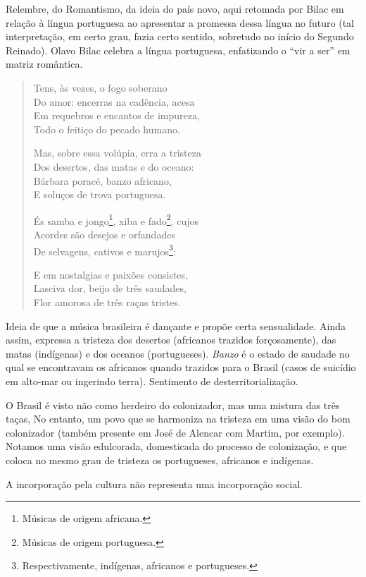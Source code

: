 Relembre, do Romantismo, da ideia do país novo, aqui retomada por Bilac em relação à língua portuguesa ao apresentar a promessa dessa língua no futuro (tal interpretação, em certo grau, fazia certo sentido, sobretudo no início do Segundo Reinado). Olavo Bilac celebra a língua portuguesa, enfatizando o ``vir a ser'' em matriz romântica.

\begin{verse}
Tens, às vezes, o fogo soberano \\
Do amor: encerras na cadência, acesa \\
Em requebros e encantos de impureza, \\
Todo o feitiço do pecado humano.

Mas, sobre essa volúpia, erra a tristeza \\
Dos desertos, das matas e do oceano: \\
Bárbara poracé, banzo africano, \\
E soluços de trova portuguesa.

És samba e jongo\footnote{Músicas de origem africana.}, xiba e fado\footnote{Músicas de origem portuguesa.}, cujos \\
Acordes são desejos e orfandades \\
De selvagens, cativos e marujos\footnote{Respectivamente, indígenas, africanos e portugueses.}:

E em nostalgias e paixões consistes, \\
Lasciva dor, beijo de três saudades, \\
Flor amorosa de três raças tristes.
\end{verse}

Ideia de que a música brasileira é dançante e propõe certa sensualidade. Ainda assim, expressa a tristeza dos desertos (africanos trazidos forçosamente), das matas (indígenas) e dos oceanos (portugueses). \textit{Banzo} é o estado de saudade no qual se encontravam os africanos quando trazidos para o Brasil (casos de suicídio em alto-mar ou ingerindo terra). Sentimento de desterritorialização.

O Brasil é visto não como herdeiro do colonizador, mas uma mistura das três taças, No entanto, um povo que se harmoniza na tristeza em uma visão do bom colonizador (também presente em José de Alencar com Martim, por exemplo). Notamos uma visão edulcorada, domesticada do processo de colonização, e que coloca no mesmo grau de tristeza os portugueses, africanos e indígenas.

A incorporação pela cultura não representa uma incorporação social.

